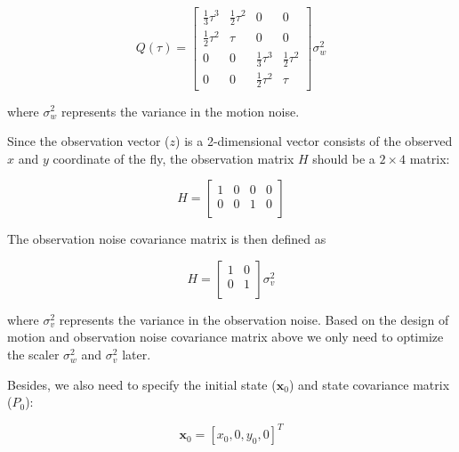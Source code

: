 \begin{equation*}
    Q(\tau) = 
    \left[ 
        \begin{array}{cccc}
          \frac{1}{3} \tau^3 & \frac{1}{2} \tau^2 & 0 & 0 \\
          \frac{1}{2} \tau^2 & \tau & 0 & 0 \\
          0 & 0 & \frac{1}{3} \tau^3 & \frac{1}{2} \tau^2 \\
          0 & 0 & \frac{1}{2} \tau^2 & \tau
        \end{array} 
    \right]
      \sigma^2_w
\end{equation*}

where $\sigma^2_w$ represents the variance in the motion noise.

Since the observation vector ($z$) is a 2-dimensional vector consists of the observed $x$ and $y$ coordinate of the fly, the observation matrix $H$ should be a $2 \times 4$ matrix:

\begin{equation*}
    H = 
    \left[ 
        \begin{array}{cccc}
            1 & 0 & 0 & 0 \\
            0 & 0 & 1 & 0 \\
        \end{array} 
    \right]
\end{equation*}

The observation noise covariance matrix is then defined as 

\begin{equation*}
    H = 
    \left[ 
        \begin{array}{cc}
          1 & 0 \\
          0 & 1 \\
        \end{array} 
    \right]
    \sigma^2_v
\end{equation*}

where $\sigma^2_v$ represents the variance in the observation noise.
Based on the design of motion and observation noise covariance matrix above we only need to optimize the scaler $\sigma^2_w$ and $\sigma^2_v$ later.

Besides, we also need to specify the initial state ($\mathbf{x}_0$) and state covariance matrix ($P_0$):

\begin{equation*}
    \mathbf{x}_0 = [x_0, 0, y_0, 0]^T
\end{equation*}

